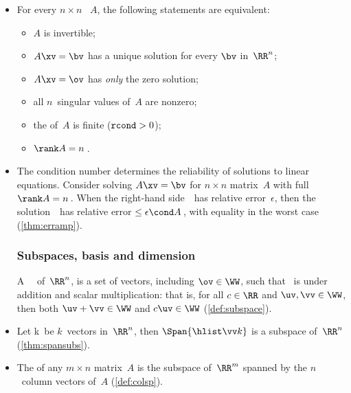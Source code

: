 \begin{itemize}
\itemme For every matrix~\(A\), let an \svd\ of~\(A\) be~\(\usv\), then the transpose~\(\tr A\) has an \svd\ of \(V(\tr S)\tr U\) (\cref{thm:ranktr}). 
Further, \(\rank(\tr A)=\rank A\)\,.

\item For every \(n\times n\) ~\(A\), the following statements are equivalent: 
\begin{itemize}
\item \(A\) is {invertible};
\item \(A\xv=\bv\) has a {unique solution} for every \(\bv\) in~\(\RR^n\);
\item \(A\xv=\ov\) has \emph{only} the zero solution;
\item all \(n\)~{singular value}s of~\(A\) are nonzero;
\item the  of~\(A\) is finite (\(\verb|rcond|>0\));
\item \(\rank A=n\)\,.
\end{itemize}

\item The condition number determines the reliability of solutions to linear equations.
Consider solving \(A\xv=\bv\) for \(n\times n\) matrix~\(A\) with full \(\rank A=n\)\,.  
When the right-hand side~\bv\ has relative error~\(\epsilon\), then the solution~\xv\ has relative error\({}\leq\epsilon\cond A\)\,, with equality in the worst case (\cref{thm:erramp}).





\subsubsection{Subspaces, basis and dimension}

\itemhi A ~\WW\ of~\(\RR^n\),  is a set of vectors, including \(\ov\in\WW\), such that \WW\ is  under addition and scalar multiplication: that is, for all \(c\in\RR\) and \(\uv,\vv\in\WW\), then both \(\uv+\vv\in\WW\) and \(c\uv\in\WW\) (\cref{def:subspace}).

\item Let \hlist\vv k\ be \(k\)~vectors in~\(\RR^n\),
then \(\Span\{\hlist\vv k\}\) is a {subspace} of~\(\RR^n\) (\cref{thm:spansubs}).

\item The  of any $m\times n$ matrix~$A$ is the {subspace} of~$\RR^m$ {span}ned by the \(n\)~{column vector}s of~$A$ (\cref{def:colsp}).
        

\end{itemize}
